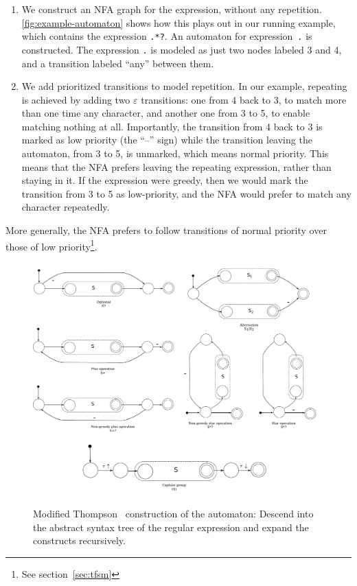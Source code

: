 \documentclass[11pt,a4paper,twoside,openright]{Thesis}
\theoremstyle{definition}
\newcommand{\Secref}[1]{section~\ref{sec:#1}}
\begin{document}
\begin{enumerate}
\item We construct an NFA graph for the expression, without any
repetition.  \autoref{fig:example-automaton} shows how this plays
out in our running example, which contains the expression \texttt{.*?}.
An automaton for expression~\texttt{.} is constructed. The expression
\texttt{.} is modeled as just two nodes labeled 3 and 4, and a
transition labeled ``any'' between them.

\item We add prioritized transitions to model repetition. In our
example, repeating is achieved by adding two $\varepsilon$ transitions:
one from 4 back to 3, to match more than one time any character,
and another one from 3 to 5, to enable matching nothing at all.
Importantly, the transition from 4 back to 3 is marked as low
priority (the ``--'' sign) while the transition leaving the automaton,
from 3 to 5, is unmarked, which means normal priority.  This means
that the NFA prefers leaving the repeating expression, rather
than staying in it.  If the expression were greedy, then we would
mark the transition from 3 to 5 as low-priority, and the NFA would
prefer to match any character repeatedly.

\end{enumerate}

More generally, the NFA prefers to follow transitions of normal
priority over those of low priority\footnote{See \Secref{tfsm}}.

\begin{figure}[tb] \includegraphics[width=\linewidth]{graphs/thompson}
  \caption[Modified Thompson construction]{Modified Thompson~\cite{Thom68a} construction of the
automaton: Descend into the abstract syntax tree of the regular
expression and expand the constructs recursively.}
\label{fig:thompson-construction}
\end{figure}
\end{document}
